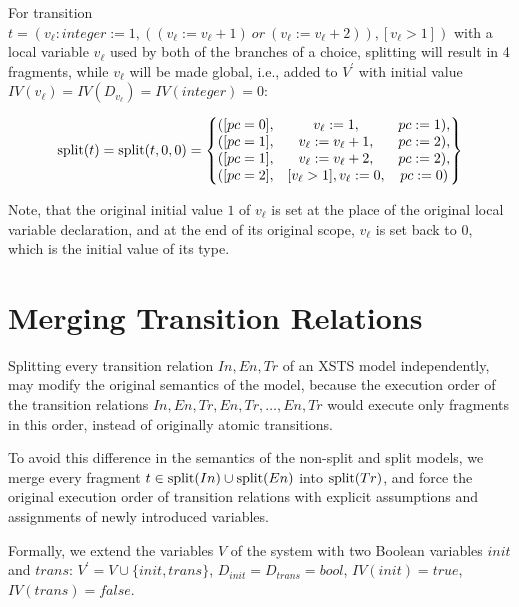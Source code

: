 \begin{example}
    For transition $t = (v_\ell : integer := 1, ((v_\ell := v_\ell + 1)\ or\ (v_\ell := v_\ell + 2)), [v_\ell > 1])$ with a local variable $v_\ell$ used by both of the branches of a choice, splitting will result in 4 fragments, while $v_\ell$ will be made global, i.e., added to $V^\prime$ with initial value $IV(v_\ell) = IV(D_{v_\ell}) = IV(integer) = 0$:

    \begin{align*}
    \mathrm{split}(t) = \mathrm{split}(t,0,0) = \begin{Bmatrix}
    ([pc = 0], & v_\ell := 1, & pc := 1), \\
    ([pc = 1], & v_\ell := v_\ell + 1, & pc := 2), \\
    ([pc = 1], & v_\ell := v_\ell + 2, & pc := 2), \\
    ([pc = 2], & [v_\ell > 1], v_\ell := 0, & pc := 0)
    \end{Bmatrix}
    \end{align*}

    Note, that the original initial value $1$ of $v_\ell$ is set at the place of the original local variable declaration, and at the end of its original scope, $v_\ell$ is set back to $0$, which is the initial value of its type.
\end{example}

\section{Merging Transition Relations}\label{sec:merging-tranrels}

Splitting every transition relation $In, En, Tr$ of an XSTS model independently, may modify the original semantics of the model, because the execution order of the transition relations $In, En, Tr, En, Tr, \ldots, En, Tr$ would execute only fragments in this order, instead of originally atomic transitions.

To avoid this difference in the semantics of the non-split and split models, we merge every fragment $t \in \mathrm{split}(In) \cup \mathrm{split}(En)$ into $\mathrm{split}(Tr)$, and force the original execution order of transition relations with explicit assumptions and assignments of newly introduced variables.

Formally, we extend the variables $V$ of the system with two Boolean variables $init$ and $trans$: $V^\prime = V \cup \{ init, trans \}$, $D_{init} = D_{trans} = bool$, $IV(init) = \textit{true}$, $IV(trans) = \textit{false}$.

